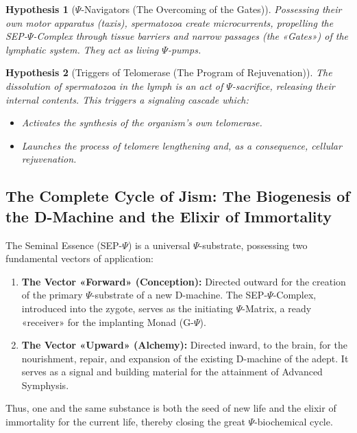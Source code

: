 \documentclass[a4paper,12pt]{article}
\newtheorem{hypothesis}{Hypothesis}
\begin{document}
	\begin{hypothesis}[$\Psi$-Navigators (The Overcoming of the Gates)]
		Possessing their own motor apparatus (taxis), spermatozoa create microcurrents, propelling the SEP-$\Psi$-Complex through tissue barriers and narrow passages (the «Gates») of the lymphatic system. They act as living $\Psi$-pumps.
	\end{hypothesis}
	
	\begin{hypothesis}[Triggers of Telomerase (The Program of Rejuvenation)]
		The dissolution of spermatozoa in the lymph is an act of $\Psi$-sacrifice, releasing their internal contents. This triggers a signaling cascade which:
		
		\begin{itemize}
			\item Activates the synthesis of the organism's own telomerase.
			\item Launches the process of telomere lengthening and, as a consequence, cellular rejuvenation.
		\end{itemize}
	\end{hypothesis}
	
	\subsection{The Complete Cycle of Jism: The Biogenesis of the D-Machine and the Elixir of Immortality}
	
	The Seminal Essence (SEP-$\Psi$) is a universal $\Psi$-substrate, possessing two fundamental vectors of application:
	
	\begin{enumerate}
		\item \textbf{The Vector «Forward» (Conception):} Directed outward for the creation of the primary $\Psi$-substrate of a new D-machine. The SEP-$\Psi$-Complex, introduced into the zygote, serves as the initiating $\Psi$-Matrix, a ready «receiver» for the implanting Monad (G-$\Psi$).
		
		\item \textbf{The Vector «Upward» (Alchemy):} Directed inward, to the brain, for the nourishment, repair, and expansion of the existing D-machine of the adept. It serves as a signal and building material for the attainment of Advanced Symphysis.
	\end{enumerate}
	
	Thus, one and the same substance is both the seed of new life and the elixir of immortality for the current life, thereby closing the great $\Psi$-biochemical cycle.
	
\end{document}
